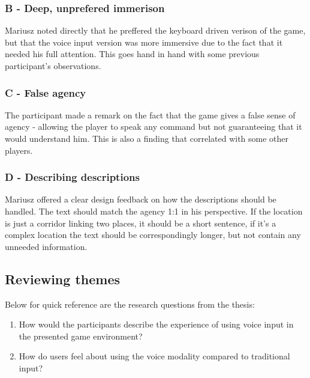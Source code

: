 \subsubsection{B - Deep, unprefered immerison}

Mariusz noted directly that he preffered the keyboard driven verison of the game, but that the voice input version was more immersive due to the fact that it needed his full attention. 
This goes hand in hand with some previous participant's observations.


\subsubsection{C - False agency}

The participant made a remark on the fact that the game gives a false sense of agency - allowing the player to speak any command but not guaranteeing that it would understand him. 
This is also a finding that correlated with some other players.

\subsubsection{D - Describing descriptions}

Mariusz offered a clear design feedback on how the descriptions should be handled. The text should match the agency 1:1 in his perspective. If the location is just a corridor linking two places, it should be a short sentence, if it's a complex location the text should be correspondingly longer, but not contain any unneeded information. 


\subsection{Reviewing themes}




Below for quick reference are the research questions from the thesis: 

\begin{enumerate}
    \item How would the participants describe the experience of using voice input in the presented
game environment?
    \item How do users feel about using the voice modality compared to traditional input?
\end{enumerate}

